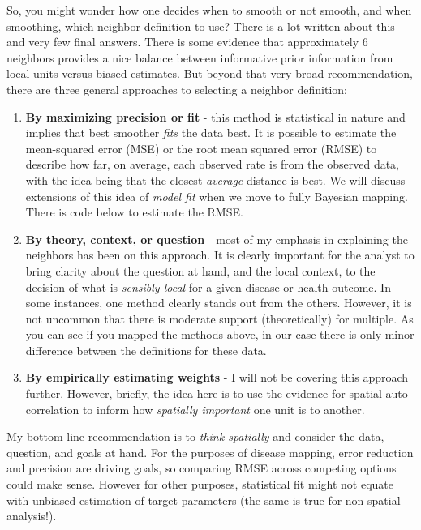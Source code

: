 \documentclass[
]{book}
\providecommand{\tightlist}{%
  \setlength{\itemsep}{0pt}\setlength{\parskip}{0pt}}
\begin{document}
So, you might wonder how one decides when to smooth or not smooth, and when smoothing, which neighbor definition to use? There is a lot written about this and very few final answers. There is some evidence that approximately 6 neighbors provides a nice balance between informative prior information from local units versus biased estimates. But beyond that very broad recommendation, there are three general approaches to selecting a neighbor definition:

\begin{enumerate}
\def\labelenumi{\arabic{enumi}.}
\tightlist
\item
  \textbf{By maximizing precision or fit} - this method is statistical in nature and implies that best smoother \emph{fits} the data best. It is possible to estimate the mean-squared error (MSE) or the root mean squared error (RMSE) to describe how far, on average, each observed rate is from the observed data, with the idea being that the closest \emph{average} distance is best. We will discuss extensions of this idea of \emph{model fit} when we move to fully Bayesian mapping. There is code below to estimate the RMSE.
\item
  \textbf{By theory, context, or question} - most of my emphasis in explaining the neighbors has been on this approach. It is clearly important for the analyst to bring clarity about the question at hand, and the local context, to the decision of what is \emph{sensibly local} for a given disease or health outcome. In some instances, one method clearly stands out from the others. However, it is not uncommon that there is moderate support (theoretically) for multiple. As you can see if you mapped the methods above, in our case there is only minor difference between the definitions for these data.
\item
  \textbf{By empirically estimating weights} - I will not be covering this approach further. However, briefly, the idea here is to use the evidence for spatial auto correlation to inform how \emph{spatially important} one unit is to another.
\end{enumerate}

My bottom line recommendation is to \emph{think spatially} and consider the data, question, and goals at hand. For the purposes of disease mapping, error reduction and precision are driving goals, so comparing RMSE across competing options could make sense. However for other purposes, statistical fit might not equate with unbiased estimation of target parameters (the same is true for non-spatial analysis!).
\end{document}

